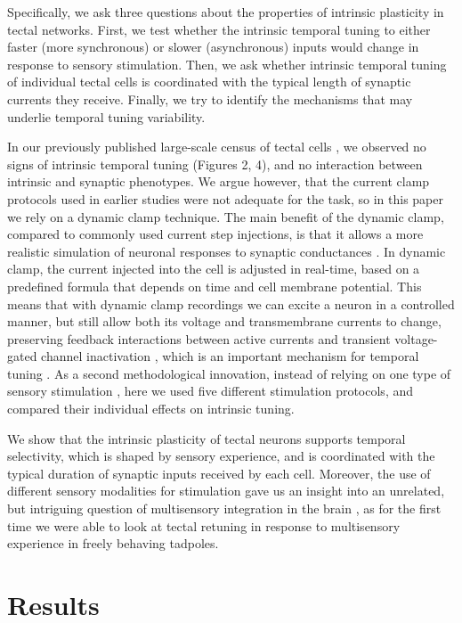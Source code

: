 \documentclass{article}
\begin{document}
Specifically, we ask three questions about the properties of intrinsic plasticity in tectal networks. First, we test whether the intrinsic temporal tuning to either faster (more synchronous) or slower (asynchronous) inputs would change in response to sensory stimulation. Then, we ask whether intrinsic temporal tuning of individual tectal cells is coordinated with the typical length of synaptic currents they receive. Finally, we try to identify the mechanisms that may underlie temporal tuning variability. 

In our previously published large-scale census of tectal cells \citep{ciarleglio2015}, we observed no signs of intrinsic temporal tuning (Figures 2, 4), and no interaction between intrinsic and synaptic phenotypes. We argue however, that the current clamp protocols used in earlier studies were not adequate for the task, so in this paper we rely on a dynamic clamp technique. The main benefit of the dynamic clamp, compared to commonly used current step injections, is that it allows a more realistic simulation of neuronal responses to synaptic conductances \citep{prinz2004}. In dynamic clamp, the current injected into the cell is adjusted in real-time, based on a predefined formula that depends on time and cell membrane potential. This means that with dynamic clamp recordings we can excite a neuron in a controlled manner, but still allow both its voltage and transmembrane currents to change, preserving feedback interactions between active currents and transient voltage-gated channel inactivation \citep{ma1996dynamic,zbili2019axonnav}, which is an important mechanism for temporal tuning \citep{branco2010dendritic,platkiewicz2011}. As a second methodological innovation, instead of relying on one type of sensory stimulation \citep{ciarleglio2015}, here we used five different stimulation protocols, and compared their individual effects on intrinsic tuning. 

We show that the intrinsic plasticity of tectal neurons supports temporal selectivity, which is shaped by sensory experience, and is coordinated with the typical duration of synaptic inputs received by each cell. Moreover, the use of different sensory modalities for stimulation gave us an insight into an unrelated, but intriguing question of multisensory integration in the brain \citep{deeg2009,felch2016,truszkowski2017}, as for the first time we were able to look at tectal retuning in response to multisensory experience in freely behaving tadpoles.


\section*{Results}
\end{document}
